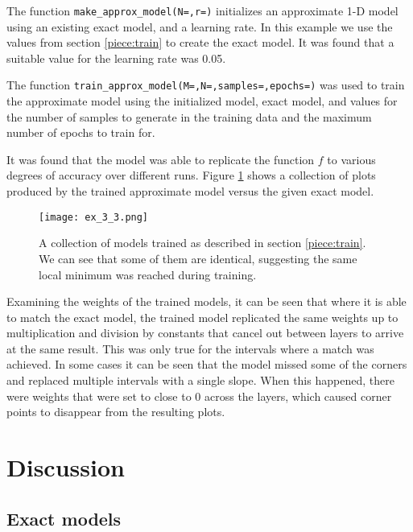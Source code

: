 \documentclass{somasmsc}
\begin{document}
\begin{exa}
The function \verb|make_approx_model(N=,r=)| initializes an approximate 1-D model using an existing exact model, and a learning rate. In this example we use the values from section \ref{piece:train} to create the exact model. It was found that a suitable value for the learning rate was 0.05.

The function \verb|train_approx_model(M=,N=,samples=,epochs=)| was used to train the approximate model using the initialized model, exact model, and values for the number of samples to generate in the training data and the maximum number of epochs to train for.

It was found that the model was able to replicate the function $f$ to various degrees of accuracy over different runs. Figure \ref{piece:ex_3_3} shows a collection of plots produced by the trained approximate model versus the given exact model.

\begin{figure}[H]\label{piece:ex_3_3}
\begin{center}
\texttt{[image: ex\_3\_3.png]}
\end{center}
\caption{A collection of models trained as described in section \ref{piece:train}. We can see that some of them are identical, suggesting the same local minimum was reached during training.}
\end{figure}

Examining the weights of the trained models, it can be seen that where it is able to match the exact model, the trained model replicated the same weights up to multiplication and division by constants that cancel out between layers to arrive at the same result. This was only true for the intervals where a match was achieved. In some cases it can be seen that the model missed some of the corners and replaced multiple intervals with a single slope. When this happened, there were weights that were set to close to 0 across the layers, which caused corner points to disappear from the resulting plots.
\end{exa}

\section{Discussion}

\subsection{Exact models}
\end{document}
